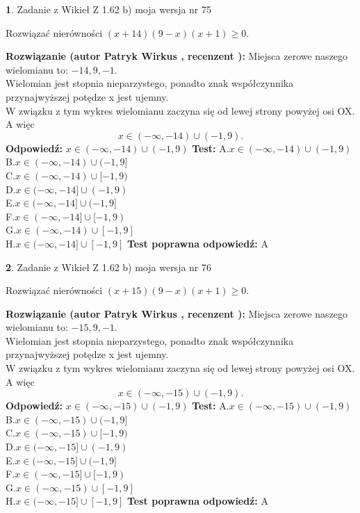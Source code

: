 \documentclass[12pt, a4paper]{article}
\theoremstyle{definition} %
\newtheorem{zad}{}
\newcommand{\zadStart}[1]{\begin{zad}#1\newline}
\newcommand{\zadStop}{\end{zad}}
\newcommand{\rozwStart}[2]{\noindent \textbf{Rozwiązanie (autor #1 , recenzent #2): }\newline}
\newcommand{\rozwStop}{\newline}
\newcommand{\odpStart}{\noindent \textbf{Odpowiedź:}\newline}
\newcommand{\odpStop}{\newline}
\newcommand{\testStart}{\noindent \textbf{Test:}\newline}
\newcommand{\testStop}{\newline}
\newcommand{\kluczStart}{\noindent \textbf{Test poprawna odpowiedź:}\newline}
\newcommand{\kluczStop}{\newline}
\begin{document}
\zadStart{Zadanie z Wikieł Z 1.62 b) moja wersja nr 75}

Rozwiązać nierówności $(x+14)(9-x)(x+1)\ge0$.
\zadStop
\rozwStart{Patryk Wirkus}{}
Miejsca zerowe naszego wielomianu to: $-14, 9, -1$.\\
Wielomian jest stopnia nieparzystego, ponadto znak współczynnika przy\linebreak najwyższej potędze x jest ujemny.\\ W związku z tym wykres wielomianu zaczyna się od lewej strony powyżej osi OX. A więc $$x \in (-\infty,-14) \cup (-1,9).$$
\rozwStop
\odpStart
$x \in (-\infty,-14) \cup (-1,9)$
\odpStop
\testStart
A.$x \in (-\infty,-14) \cup (-1,9)$\\
B.$x \in (-\infty,-14) \cup (-1,9]$\\
C.$x \in (-\infty,-14) \cup [-1,9)$\\
D.$x \in (-\infty,-14] \cup (-1,9)$\\
E.$x \in (-\infty,-14] \cup (-1,9]$\\
F.$x \in (-\infty,-14] \cup [-1,9)$\\
G.$x \in (-\infty,-14) \cup [-1,9]$\\
H.$x \in (-\infty,-14] \cup [-1,9]$
\testStop
\kluczStart
A
\kluczStop



\zadStart{Zadanie z Wikieł Z 1.62 b) moja wersja nr 76}

Rozwiązać nierówności $(x+15)(9-x)(x+1)\ge0$.
\zadStop
\rozwStart{Patryk Wirkus}{}
Miejsca zerowe naszego wielomianu to: $-15, 9, -1$.\\
Wielomian jest stopnia nieparzystego, ponadto znak współczynnika przy\linebreak najwyższej potędze x jest ujemny.\\ W związku z tym wykres wielomianu zaczyna się od lewej strony powyżej osi OX. A więc $$x \in (-\infty,-15) \cup (-1,9).$$
\rozwStop
\odpStart
$x \in (-\infty,-15) \cup (-1,9)$
\odpStop
\testStart
A.$x \in (-\infty,-15) \cup (-1,9)$\\
B.$x \in (-\infty,-15) \cup (-1,9]$\\
C.$x \in (-\infty,-15) \cup [-1,9)$\\
D.$x \in (-\infty,-15] \cup (-1,9)$\\
E.$x \in (-\infty,-15] \cup (-1,9]$\\
F.$x \in (-\infty,-15] \cup [-1,9)$\\
G.$x \in (-\infty,-15) \cup [-1,9]$\\
H.$x \in (-\infty,-15] \cup [-1,9]$
\testStop
\kluczStart
A
\kluczStop
\end{document}
